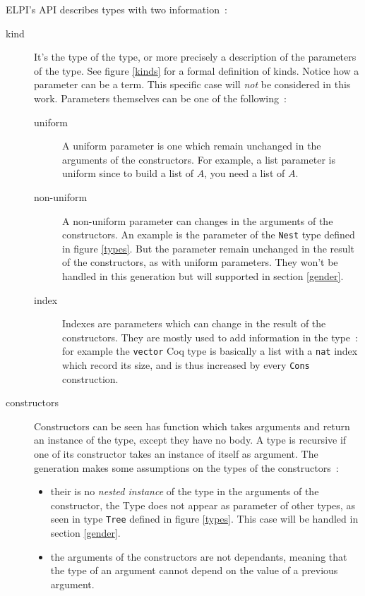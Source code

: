 \documentclass{article}
\begin{document}
ELPI's API describes types with two information~:\begin{description}
    \item[kind] It's the type of the type, or more precisely a description of
        the parameters of the type. See figure \ref{kinds} for a formal
        definition of kinds. Notice how a parameter can be a term. This specific
        case will \emph{not} be considered in this work. Parameters themselves
        can be one of the following~:\begin{description}
            \item[uniform] A uniform parameter is one which remain unchanged
                in the arguments of the constructors. For example, a list parameter
                is uniform since to build a list of $A$, you need a list of $A$.
            \item[non-uniform] A non-uniform parameter can changes in the arguments
                of the constructors. An example is the parameter of the
                \texttt{Nest} type defined in figure \ref{types}. But the parameter
                remain unchanged in the result of the constructors, as with
                uniform parameters. They won't be handled in this generation
                but will supported in section \ref{gender}.
            \item[index] Indexes are parameters which can change in the result
                of the constructors. They are mostly used to add information
                in the type~: for example the \texttt{vector} Coq type is basically
                a list with a \texttt{nat} index which record its size, and is
                thus increased by every \texttt{Cons} construction.
        \end{description}
    \item[constructors] Constructors can be seen has function which takes arguments
        and return an instance of the type, except they have no body. A type is
        recursive if one of its constructor takes an instance of itself as
        argument. The generation makes some assumptions on the types of the
        constructors~:\begin{itemize}
            \item their is no \emph{nested instance} of the type in the arguments
                of the constructor, the Type does not appear as parameter of
                other types, as seen in type
                \texttt{Tree} defined in figure \ref{types}. This case will be
                handled in section \ref{gender}.
            \item the arguments of the constructors are not dependants, meaning
                that the type of an argument cannot depend on the value of
                a previous argument.
        \end{itemize}
\end{description}
\end{document}
